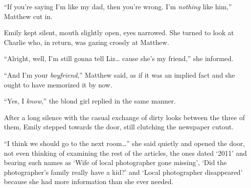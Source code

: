 “If you’re saying I’m like my dad, then you’re wrong. I’m \textit{nothing} like him,” Matthew cut in.

Emily kept silent, mouth slightly open, eyes narrowed. She turned to look at Charlie who, in return, was gazing crossly at Matthew.

“Alright, well, I’m still gonna tell Liz… cause she’s my friend,” she informed.

“And I’m your \textit{boyfriend},” Matthew said, as if it was an implied fact and she ought to have memorized it by now.

“Yes, I \textit{know},” the blond girl replied in the same manner.

After a long silence with the casual exchange of dirty looks between the three of them, Emily stepped towards the door, still clutching the newspaper cutout.

“I think we should go to the next room…” she said quietly and opened the door, not even thinking of examining the rest of the articles, the ones dated ‘2011’ and bearing such names as ‘Wife of local photographer gone missing’, ‘Did the photographer’s family really have a kid?’ and ‘Local photographer disappeared’ because she had more information than she ever needed.